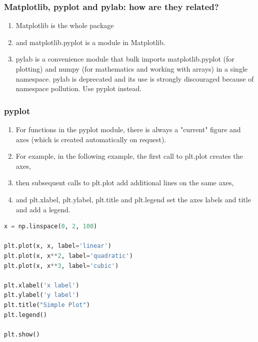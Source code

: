 \documentclass[UTF8,a4paper,12pt]{ctexart}  %
\providecommand{\tightlist}{\setlength{\itemsep}{0pt}\setlength{\parskip}{0pt}}
\begin{document}
\hypertarget{matplotlib-pyplot-and-pylab-how-are-they-related}{%
\subsubsection{Matplotlib, pyplot and pylab: how are they related?}\label{matplotlib-pyplot-and-pylab-how-are-they-related}}

\begin{enumerate}
\def\labelenumi{\arabic{enumi}.}
\tightlist
\item
  Matplotlib is the whole package
\item
  and matplotlib.pyplot is a module in Matplotlib.
\item
  pylab is a convenience module that bulk imports matplotlib.pyplot
  (for plotting) and numpy (for mathematics and working with arrays)
  in a single namespace. pylab is deprecated and its use is strongly
  discouraged because of namespace pollution. Use pyplot instead.
\end{enumerate}

\hypertarget{pyplot}{%
\subsubsection{pyplot}\label{pyplot}}

\begin{enumerate}
\def\labelenumi{\arabic{enumi}.}
\tightlist
\item
  For functions in the pyplot module, there is always a "current"
  figure and axes (which is created automatically on request).
\item
  For example, in the following example, the first call to plt.plot
  creates the axes,
\item
  then subsequent calls to plt.plot add additional lines on the same
  axes,
\item
  and plt.xlabel, plt.ylabel, plt.title and plt.legend set the axes
  labels and title and add a legend.
\end{enumerate}

\begin{lstlisting}[language=Python]
x = np.linspace(0, 2, 100)

plt.plot(x, x, label='linear')
plt.plot(x, x**2, label='quadratic')
plt.plot(x, x**3, label='cubic')

plt.xlabel('x label')
plt.ylabel('y label')
plt.title("Simple Plot")
plt.legend()

plt.show()
\end{lstlisting}
\end{document}
